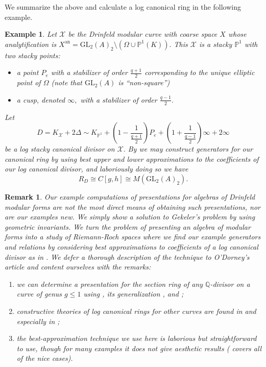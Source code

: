 \documentclass[11pt]{amsart}
\newtheorem{example}[theorem]{Example}
\newtheorem{remark}[theorem]{Remark}
\theoremstyle{definition}
\numberwithin{equation}{section}
\newcommand{\GL}{\mathrm{GL}} 	%
\newcommand{\sX}{\mathscr{X}}		%
\newcommand{\bbP}{\mathbb{P}}		%
\newcommand{\bbQ}{\mathbb{Q}}		%
\begin{document}
We summarize the above and calculate a log canonical ring in the following example.
\begin{example}
Let $\sX$ be the Drinfeld modular curve with coarse space $X$ whose analytification is $X^{\text{an}}=\GL_2(A)_2\setminus(\Omega\cup\bbP^1(K)).$ This $\sX$ is a stacky $\bbP^1$ with two stacky points: 
\begin{itemize}
	\item a point $P_e$ with a stabilizer of order $\displaystyle{\frac{q+1}{2}}$ corresponding to the unique elliptic point of $\Omega$ (note that $\GL_2(A)$ is ``non-square'')
	\item a cusp, denoted $\infty,$ with a stabilizer of order $\displaystyle{\frac{q-1}{2}}.$
\end{itemize} 

Let \[D=K_{\sX}+2\Delta\sim K_{\bbP^1}+\left(1-\frac{1}{\frac{q+1}{2}} \right)P_e + \left(1+\frac{1}{\frac{q-1}{2}}\right)\infty+2\infty\] be a log stacky canonical divisor on $\sX.$ By \cite[Theorem $6$]{ODorney-canonical-rings-Q-divisors-on-P1} we may construct generators for our canonical ring by using best upper and lower approximations to the coefficients of our log canonical divisor, and laboriously doing so we have \[R_D\cong C[g,h]\cong M(\GL_2(A)_2).\]
\end{example}

\begin{remark}\label{r: how we compute canonical rings in our examples}
	Our example computations of presentations for algebras of Drinfeld modular forms are not the most direct means of obtaining such presentations, nor are our examples new. We simply show a solution to Gekeler's problem by using geometric invariants. We turn the problem of presenting an algebra of modular forms into a study of Riemann-Roch spaces where we find our example generators and relations by considering best approximations to coefficients of a log canonical divisor as in \cite{ODorney-canonical-rings-Q-divisors-on-P1}. We defer a thorough description of the technique to O'Dorney's article and content ourselves with the remarks:
	\begin{enumerate}
		\item we can determine a presentation for the section ring of any $\bbQ$-divisor on a curve of genus $g\leq 1$ using \cite{ODorney-canonical-rings-Q-divisors-on-P1}, its generalization \cite{Cerchia-Franklin-ODorney-Qdiv-Ell-curves}, and \cite{VZB};
		\item constructive theories of log canonical rings for other curves are found in \cite{Landesman-Ruhm-Zhang-Spin-canonical-rings} and especially in \cite{VZB};
		\item the best-approximation technique we use here is laborious but straightforward to use, though for many examples it does not give aesthetic results (\cite{VZB} covers all of the nice cases).  
	\end{enumerate}
\end{remark}
\end{document}

